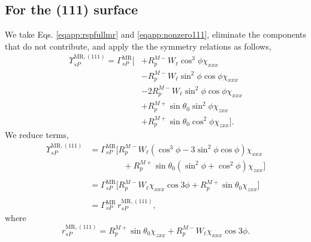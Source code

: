 \subsection{For the (111) surface}

We take Eqs. \eqref{eqapp:rspfullmr} and \eqref{eqapp:nonzero111}, eliminate the
components that do not contribute, and apply the the symmetry relations as
follows,
\begin{equation*}
\begin{split}
\Upsilon^{\mathrm{MR},(111)}_{sP} =
\Gamma^{\mathrm{MR}}_{sP}
\big[
&+ R^{M-}_{p}W_{\ell}\cos^{3}\phi\chi_{xxx}\\
&- R^{M-}_{p}W_{\ell}\sin^{2}\phi\cos\phi\chi_{xxx}\\
&- 2R^{M-}_{p}W_{\ell}\sin^{2}\phi\cos\phi\chi_{xxx}\\
&+ R^{M+}_{p}\sin\theta_{0}\sin^{2}\phi\chi_{zxx}\\
&+ R^{M+}_{p}\sin\theta_{0}\cos^{2}\phi\chi_{zxx}
\big].
\end{split}
\end{equation*}
We reduce terms,
\begin{equation*}
\begin{split}
\Upsilon^{\mathrm{MR},(111)}_{sP} &=
\Gamma^{\mathrm{MR}}_{sP}
\big[
R^{M-}_{p}W_{\ell}(\cos^{3}\phi - 3\sin^{2}\phi\cos\phi)\chi_{xxx}\\
&\qquad\qquad+ R^{M+}_{p}\sin\theta_{0}(\sin^{2}\phi + \cos^{2}\phi)\chi_{zxx}
\big]\\\\
&=
\Gamma^{\mathrm{MR}}_{sP}
\big[
R^{M-}_{p}W_{\ell}\chi_{xxx}\cos3\phi + R^{M+}_{p}\sin\theta_{0}\chi_{zxx}
\big]\\\\
& = \Gamma^{\mathrm{MR}}_{sP}\,r^{\mathrm{MR},(111)}_{sP},
\end{split}
\end{equation*}
where
\begin{equation}\label{eqapp:final-rsp.mr.111}
r^{\mathrm{MR},(111)}_{sP} = 
R^{M+}_{p}\sin\theta_{0}\chi_{zxx} + R^{M-}_{p}W_{\ell}\chi_{xxx}\cos3\phi.
\end{equation}

